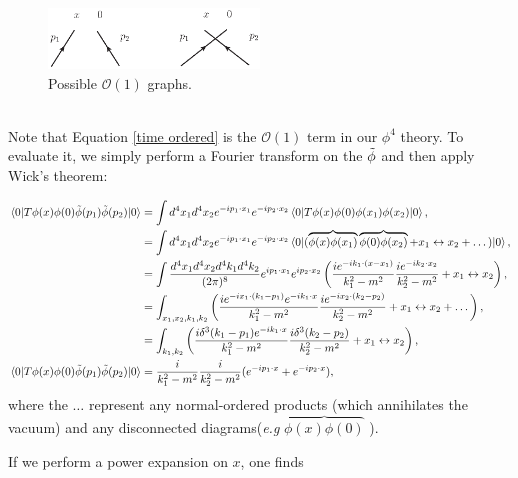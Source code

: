 \documentclass{article}
\begin{document}
\begin{figure}[H]
\centering
\includegraphics*[width=0.5\textwidth]{Graphs/Fig1011a.eps}
\caption{Possible $\mathcal{O}(1)$ graphs. }
\label{fig:10.1.1}
\end{figure}\\

Note that Equation \ref{time ordered} is the $\mathcal{O}(1)$ term in our $\phi^4$ theory. To evaluate it, we simply perform a Fourier transform on the $\Tilde{\phi}$ and then apply Wick's theorem:

\begin{equation}
    \begin{split}
        \mel{0}{T\phi(x)\phi(0)\Tilde{\phi}(p_1)\Tilde{\phi}(p_2)}{0}&=\int d^4x_1d^4x_2 e^{-ip_1\cdot x_1}e^{-ip_2\cdot x_2}\mel{0}{T\phi(x)\phi(0)\phi(x_1)\phi(x_2)}{0},\\
        &=\int d^4x_1d^4x_2 e^{-ip_1\cdot x_1}e^{-ip_2\cdot x_2}\mel{0}{(\overbrace{\phi(x)\phi(x_1)}\overbrace{\phi(0)\phi(x_2)} + x_1\leftrightarrow x_2 + \dots)}{0},\\
        &= \int \frac{d^4x_1d^4x_2d^4k_1d^4k_2}{(2\pi)^8} e^{ip_1\cdot x_1}e^{ip_2\cdot x_2} \left(\frac{ie^{-ik_1\cdot (x-x_1)}}{k_1^2-m^2}\frac{ie^{-ik_2\cdot x_2}}{k_2^2-m^2}+ x_1\leftrightarrow x_2 \right),\\
        &= \int_{x_1,x_2,k_1,k_2}  \left(\frac{ie^{-ix_1\cdot (k_1-p_1)}e^{-ik_1\cdot x}}{k_1^2-m^2}\frac{ie^{-ix_2\cdot (k_2-p_2)}}{k_2^2-m^2}+ x_1\leftrightarrow x_2 + \dots\right),\\
        &= \int_{k_1,k_2}  \left(\frac{i\delta^3(k_1-p_1)e^{-ik_1\cdot x}}{k_1^2-m^2}\frac{i\delta^3(k_2-p_2)}{k_2^2-m^2}+ x_1\leftrightarrow x_2 \right),\\
        \mel{0}{T\phi(x)\phi(0)\Tilde{\phi}(p_1)\Tilde{\phi}(p_2)}{0}&= \frac{i}{k_1^2-m^2}\frac{i}{k_2^2-m^2}(e^{-ip_1\cdot x}+e^{-ip_2\cdot x}),\\
    \end{split}
\end{equation}
where the $\dots$ represent any normal-ordered products (which annihilates the vacuum) and any disconnected diagrams(\textit{e.g} $\overbrace{\phi(x)\phi(0)}$ ).

If we perform a power expansion on $x$, one finds
\end{document}
